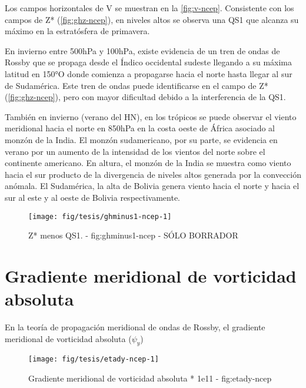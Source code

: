 \documentclass[spanish,a4paper]{book}
\begin{document}
Los campos horizontales de V se muestran en la \autoref{fig:v-ncep}.
Consistente con los campos de Z* (\autoref{fig:ghz-ncep}), en niveles
altos se observa una QS1 que alcanza su máximo en la estratósfera de
primavera.

En invierno entre 500hPa y 100hPa, existe evidencia de un tren de ondas
de Rossby que se propaga desde el Índico occidental sudeste llegando a
su máxima latitud en 150°O donde comienza a propagarse hacia el norte
hasta llegar al sur de Sudamérica. Este tren de ondas puede
identificarse en el campo de Z* (\autoref{fig:ghz-ncep}), pero con mayor
dificultad debido a la interferencia de la QS1.

También en invierno (verano del HN), en los trópicos se puede observar
el viento meridional hacia el norte en 850hPa en la costa oeste de
África asociado al monzón de la India. El monzón sudamericano, por su
parte, se evidencia en verano por un aumento de la intensidad de los
vientos del norte sobre el continente americano. En altura, el monzón de
la India se muestra como viento hacia el sur producto de la divergencia
de niveles altos generada por la convección anómala. El Sudamérica, la
alta de Bolivia genera viento hacia el norte y hacia el sur al este y al
oeste de Bolivia respectivamente.

\begin{figure}

{\centering \texttt{[image: fig/tesis/ghminus1-ncep-1]} 

}

\caption{Z* menos QS1. - fig:ghminus1-ncep - SÓLO BORRADOR}\label{fig:ghminus1-ncep}
\end{figure}

\section{Gradiente meridional de vorticidad
absoluta}\label{gradiente-meridional-de-vorticidad-absoluta}

En la teoría de propagación meridional de ondas de Rossby, el gradiente
meridional de vorticidad absoluta (\(\psi_y\))

\begin{figure}

{\centering \texttt{[image: fig/tesis/etady-ncep-1]} 

}

\caption{Gradiente meridional de vorticidad absoluta * 1e11 - fig:etady-ncep}\label{fig:etady-ncep}
\end{figure}
\end{document}
